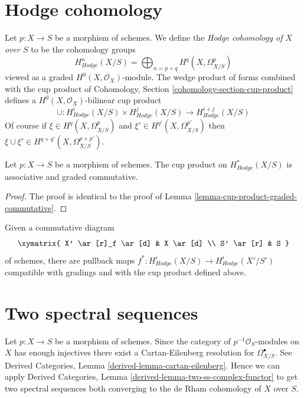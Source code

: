 \section{Hodge cohomology}
\label{section-hodge-cohomology}

\noindent
Let $p : X \to S$ be a morphism of schemes. We define the
{\it Hodge cohomology of $X$ over $S$} to be the cohomology groups
$$
H^n_{Hodge}(X/S) = \bigoplus\nolimits_{n = p + q} H^q(X, \Omega^p_{X/S})
$$
viewed as a graded $H^0(X, \mathcal{O}_X)$-module. The wedge product
of forms combined with the cup product of
Cohomology, Section \ref{cohomology-section-cup-product}
defines a $H^0(X, \mathcal{O}_X)$-bilinear cup product
$$
\cup :
H^i_{Hodge}(X/S) \times H^j_{Hodge}(X/S)
\longrightarrow
H^{i + j}_{Hodge}(X/S)
$$
Of course if $\xi \in H^q(X, \Omega^p_{X/S})$ and
$\xi' \in H^{q'}(X, \Omega^{p'}_{X/S})$ then $\xi \cup \xi' \in
H^{q + q'}(X, \Omega^{p + p'}_{X/S})$.

\begin{lemma}
\label{lemma-cup-product-hodge-graded-commutative}
Let $p : X \to S$ be a morphism of schemes.
The cup product on $H^*_{Hodge}(X/S)$ is associative and graded commutative.
\end{lemma}

\begin{proof}
The proof is identical to the proof of
Lemma \ref{lemma-cup-product-graded-commutative}.
\end{proof}

\noindent
Given a commutative diagram
$$
\xymatrix{
X' \ar[r]_f \ar[d] & X \ar[d] \\
S' \ar[r] & S
}
$$
of schemes, there are pullback maps
$f^* : H^i_{Hodge}(X/S) \longrightarrow H^i_{Hodge}(X'/S')$
compatible with gradings and with the cup product defined above.







\section{Two spectral sequences}
\label{section-hodge-to-de-rham}

\noindent
Let $p : X \to S$ be a morphism of schemes. Since the category
of $p^{-1}\mathcal{O}_S$-modules on $X$ has enough injectives
there exist a Cartan-Eilenberg resolution for $\Omega^\bullet_{X/S}$.
See Derived Categories, Lemma \ref{derived-lemma-cartan-eilenberg}.
Hence we can apply Derived Categories, Lemma
\ref{derived-lemma-two-ss-complex-functor} to get two spectral sequences
both converging to the de Rham cohomology of $X$ over $S$.

